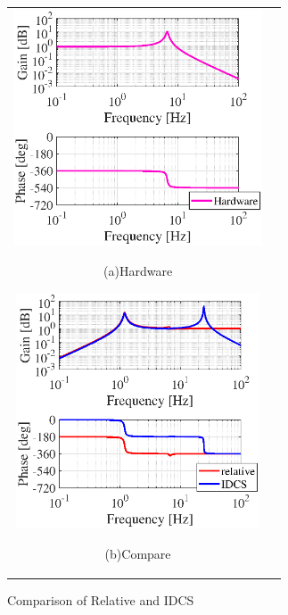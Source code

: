 \documentclass[a4paper,12pt]{article_vdlab_sotsuron}
\begin{document}
\vspace*{3mm}
\begin{figure}[h]
  \begin{tabular}{cc}
  \begin{minipage}{0.5\hsize}
  \begin{center}
    \includegraphics[height=70mm]{figure/bode_hardware.eps}
    \end{center}
    \begin{center}
    \ (a)Hardware\
    \end{center}
  \end{minipage}
  \begin{minipage}{0.5\hsize}
     \begin{center}
      \includegraphics[height=70mm]{figure/bode_comparison.eps}
      \end{center}
      \begin{center}
      \ (b)Compare\
    \end{center}
  \end{minipage}
  \end{tabular}
  \vspace*{3mm}
  \caption{Comparison of Relative and IDCS}
    \label{fig:bode_comparison}
\end{figure}
\end{document}
